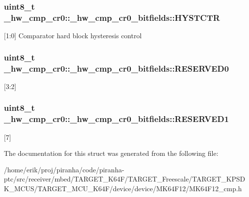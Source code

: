 \subsubsection[{\texorpdfstring{H\+Y\+S\+T\+C\+TR}{HYSTCTR}}]{\setlength{\rightskip}{0pt plus 5cm}uint8\+\_\+t \+\_\+hw\+\_\+cmp\+\_\+cr0\+::\+\_\+hw\+\_\+cmp\+\_\+cr0\+\_\+bitfields\+::\+H\+Y\+S\+T\+C\+TR}\hypertarget{struct__hw__cmp__cr0_1_1__hw__cmp__cr0__bitfields_aa63ffa0890adc357e7fe6f0000340375}{}\label{struct__hw__cmp__cr0_1_1__hw__cmp__cr0__bitfields_aa63ffa0890adc357e7fe6f0000340375}
\mbox{[}1\+:0\mbox{]} Comparator hard block hysteresis control 
\subsubsection[{\texorpdfstring{R\+E\+S\+E\+R\+V\+E\+D0}{RESERVED0}}]{\setlength{\rightskip}{0pt plus 5cm}uint8\+\_\+t \+\_\+hw\+\_\+cmp\+\_\+cr0\+::\+\_\+hw\+\_\+cmp\+\_\+cr0\+\_\+bitfields\+::\+R\+E\+S\+E\+R\+V\+E\+D0}\hypertarget{struct__hw__cmp__cr0_1_1__hw__cmp__cr0__bitfields_a39ad7e4fa627559595d5cb3f0cf5863d}{}\label{struct__hw__cmp__cr0_1_1__hw__cmp__cr0__bitfields_a39ad7e4fa627559595d5cb3f0cf5863d}
\mbox{[}3\+:2\mbox{]} 
\subsubsection[{\texorpdfstring{R\+E\+S\+E\+R\+V\+E\+D1}{RESERVED1}}]{\setlength{\rightskip}{0pt plus 5cm}uint8\+\_\+t \+\_\+hw\+\_\+cmp\+\_\+cr0\+::\+\_\+hw\+\_\+cmp\+\_\+cr0\+\_\+bitfields\+::\+R\+E\+S\+E\+R\+V\+E\+D1}\hypertarget{struct__hw__cmp__cr0_1_1__hw__cmp__cr0__bitfields_a685e29d750556032aca758f1f1de9497}{}\label{struct__hw__cmp__cr0_1_1__hw__cmp__cr0__bitfields_a685e29d750556032aca758f1f1de9497}
\mbox{[}7\mbox{]} 

The documentation for this struct was generated from the following file\+:\begin{DoxyCompactItemize}
\item 
/home/erik/proj/piranha/code/piranha-\/ptc/src/receiver/mbed/\+T\+A\+R\+G\+E\+T\+\_\+\+K64\+F/\+T\+A\+R\+G\+E\+T\+\_\+\+Freescale/\+T\+A\+R\+G\+E\+T\+\_\+\+K\+P\+S\+D\+K\+\_\+\+M\+C\+U\+S/\+T\+A\+R\+G\+E\+T\+\_\+\+M\+C\+U\+\_\+\+K64\+F/device/device/\+M\+K64\+F12/M\+K64\+F12\+\_\+cmp.\+h\end{DoxyCompactItemize}
